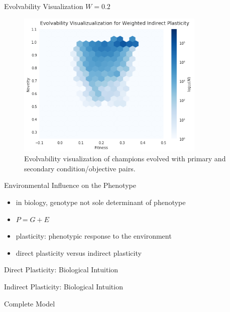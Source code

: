 \begin{frame}{Evolvability Visualization $W=0.2$}
\begin{figure}
    \centering
    \includegraphics[width=0.8\textwidth]{img/ev_w0_2}
 	\captionsetup{singlelinecheck=off,justification=raggedright}
  	\caption{Evolvability visualization of champions evolved with primary and secondary condition/objective pairs.}
    \label{fig:es_w0_2}
\end{figure}
\end{frame}


\begin{frame}{Environmental Influence on the Phenotype}
\begin{itemize}
	\item in biology, genotype not sole determinant of phenotype
    \item $P = G + E$
    \item plasticity: phenotypic response to the environment
    \item direct plasticity versus indirect plasticity
\end{itemize}
\end{frame}

\begin{frame}{Direct Plasticity: Biological Intuition}
  
\end{frame}

\begin{frame}{Indirect Plasticity: Biological Intuition}
  
\end{frame}

\begin{frame}{Complete Model}

\end{frame}

